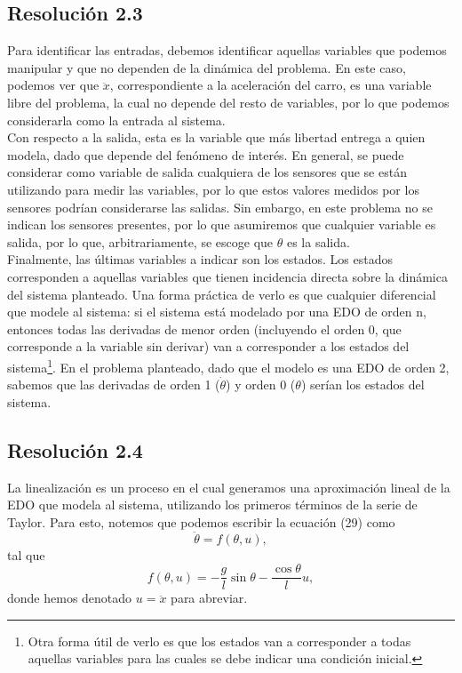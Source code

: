 \documentclass[
  11pt,
  letterpaper,
   addpoints,
   answers
  ]{exam}
\begin{document}
\begin{questions}
\begin{solution}
\subsection*{Resolución 2.3}
Para identificar las entradas, debemos identificar aquellas variables que podemos manipular y que no dependen de la dinámica del problema. En este caso, podemos ver que $\ddot{x}$, correspondiente a la aceleración del carro, es una variable libre del problema, la cual no depende del resto de variables, por lo que podemos considerarla como la entrada al sistema.\\
Con respecto a la salida, esta es la variable que más libertad entrega a quien modela, dado que depende del fenómeno de interés. En general, se puede considerar como variable de salida cualquiera de los sensores que se están utilizando para medir las variables, por lo que estos valores medidos por los sensores podrían considerarse las salidas. Sin embargo, en este problema no se indican los sensores presentes, por lo que asumiremos que cualquier variable es salida, por lo que, arbitrariamente, se escoge que $\theta$ es la salida.\\
Finalmente, las últimas variables a indicar son los estados. Los estados corresponden a aquellas variables que tienen incidencia directa sobre la dinámica del sistema planteado. Una forma práctica de verlo es que cualquier diferencial que modele al sistema: si el sistema está modelado por una EDO de orden n, entonces todas las derivadas de menor orden (incluyendo el orden 0, que corresponde a la variable sin derivar) van a corresponder a los estados del sistema\footnote{Otra forma útil de verlo es que los estados van a corresponder a todas aquellas variables para las cuales se debe indicar una condición inicial.}. En el problema planteado, dado que el modelo es una EDO de orden 2, sabemos que las derivadas de orden 1 ($\dot{\theta}$) y orden 0 ($\theta$) serían los estados del sistema.
\subsection*{Resolución 2.4}
La linealización es un proceso en el cual generamos una aproximación lineal de la EDO que modela al sistema, utilizando los primeros términos de la serie de Taylor.
Para esto, notemos que podemos escribir la ecuación (29) como
\begin{equation}
    \ddot{\theta} = f(\theta, u),
\end{equation}
tal que
\begin{equation}
    f(\theta, u) = -\frac{g}{l} \sin \theta - \frac{\cos \theta}{l} u,
\end{equation}
donde hemos denotado $u = \ddot{x}$ para abreviar. 


\end{solution}
\end{questions}
\end{document}
